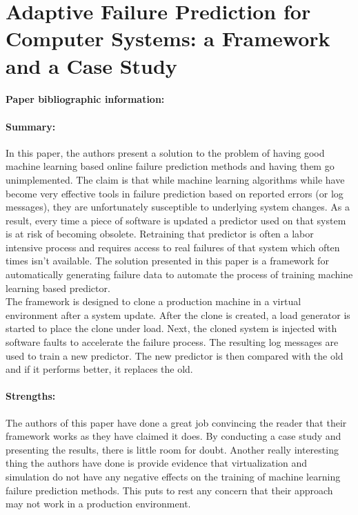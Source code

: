 \documentclass[11pt]{article}
\begin{document}

\newpage
\section{Adaptive Failure Prediction for Computer Systems: a Framework and a
Case Study}
\paragraph{Paper bibliographic information:}
\paragraph{Summary:}  In this paper, the authors present a solution to the
problem of having good machine learning based online failure prediction methods
and having them go unimplemented.  The claim is that while machine learning
algorithms while have become very effective tools in failure prediction based
on reported errors (or log messages), they are unfortunately susceptible to
underlying system changes.  As a result, every time a piece of software is
updated a predictor used on that system is at risk of becoming obsolete.
Retraining that predictor is often a labor intensive process and requires
access to real failures of that system which often times isn't available.  The
solution presented in this paper is a framework for automatically generating
failure data to automate the process of training machine learning based
predictor.\\

The framework is designed to clone a production machine in a virtual
environment after a system update.  After the clone is created, a load
generator is started to place the clone under load.  Next, the cloned system is
injected with software faults to accelerate the failure process.  The resulting
log messages are used to train a new predictor.  The new predictor is then
compared with the old and if it performs better, it replaces the old.

\paragraph{Strengths:}  The authors of this paper have done a great job
convincing the reader that their framework works as they have claimed it does.
By conducting a case study and presenting the results, there is little room for
doubt.  Another really interesting thing the authors have done is provide
evidence that virtualization and simulation do not have any negative effects on
the training of machine learning failure prediction methods.  This puts to rest
any concern that their approach may not work in a production environment.
\end{document}
